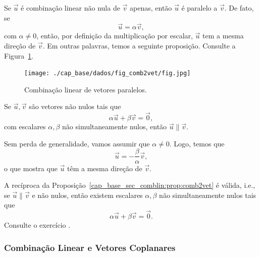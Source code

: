 Se $\vec{u}$ é combinação linear não nula de $\vec{v}$ apenas, então $\vec{u}$ é paralelo a $\vec{v}$. De fato, se
\begin{equation}
  \vec{u} = \alpha\vec{v},
\end{equation}
com $\alpha\neq 0$, então, por definição da multiplicação por escalar, $\vec{u}$ tem a mesma direção de $\vec{v}$. Em outras palavras, temos a seguinte proposição. Consulte a Figura~\ref{cap_base_sec_comblin:fig:comb2vet}.

\begin{figure}[h]
  \centering
  \texttt{[image: ./cap\_base/dados/fig\_comb2vet/fig.jpg]}
  \caption{Combinação linear de vetores paralelos.}
  \label{cap_base_sec_comblin:fig:comb2vet}
\end{figure}

\begin{proposicao}\label{cap_base_sec_comblin:prop:comb2vet}
  Se $\vec{u},\vec{v}$ são vetores não nulos tais que
  \begin{equation}
    \alpha\vec{u} + \beta\vec{v} = \vec{0},
  \end{equation}
  com escalares $\alpha,\beta$ não simultaneamente nulos, então $\vec{u}\parallel \vec{v}$.
\end{proposicao}
\begin{demonstracao}
  Sem perda de generalidade, vamos assumir que $\alpha\neq 0$. Logo, temos que
  \begin{equation}
    \vec{u} = -\frac{\beta}{\alpha}\vec{v},
  \end{equation}
  o que mostra que $\vec{u}$ têm a mesma direção de $\vec{v}$.
\end{demonstracao}

\begin{obs}
  A recíproca da Proposição~\ref{cap_base_sec_comblin:prop:comb2vet} é válida, i.e., se $\vec{u}\parallel\vec{v}$ e não nulos, então existem escalares $\alpha,\beta$ não simultaneamente nulos tais que
  \begin{equation}
    \alpha\vec{u} + \beta\vec{v} = \vec{0}.
  \end{equation}
  Consulte o exercício .
\end{obs}

\subsubsection{Combinação Linear e Vetores Coplanares}

